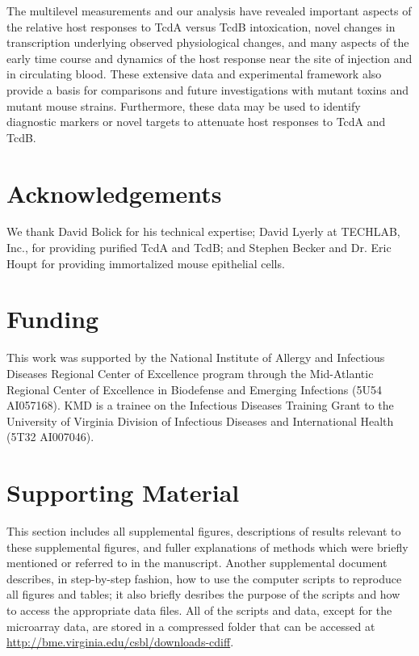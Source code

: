 The multilevel measurements and our analysis have revealed 
important aspects of the relative host responses to TcdA versus 
TcdB intoxication, novel changes in transcription underlying 
observed physiological changes, and many aspects of the early 
time course and dynamics of the host response near the site of 
injection and in circulating blood. These extensive data and 
experimental framework also provide a basis for comparisons and 
future investigations with mutant toxins and mutant mouse strains. 
Furthermore, these data may be used to identify diagnostic markers 
or novel targets to attenuate host responses to TcdA and TcdB. 

\section{Acknowledgements}
We thank David Bolick for his technical expertise; David Lyerly 
at TECHLAB, Inc., for providing purified TcdA and TcdB; and Stephen 
Becker and Dr. Eric Houpt for providing immortalized mouse epithelial cells.

\section{Funding}
This work was supported by the National Institute of Allergy and 
Infectious Diseases Regional Center of Excellence program through 
the Mid-Atlantic Regional Center of Excellence in Biodefense and 
Emerging Infections (5U54 AI057168). KMD is a trainee on the Infectious 
Diseases Training Grant to the University of Virginia Division of 
Infectious Diseases and International Health (5T32 AI007046).

\beginsupplement
\section{Supporting Material}

This section includes all supplemental figures, descriptions of results relevant
to these supplemental figures, and fuller explanations of
methods which were briefly mentioned or referred to in
the manuscript. Another supplemental document describes,
in step-by-step fashion, how to use the computer scripts to
reproduce all figures and tables; it also
briefly desribes the purpose of the scripts and how to access the appropriate
data files. All of the scripts and data, except for the microarray data, are stored 
in a compressed folder that can be accessed at
\url{http://bme.virginia.edu/csbl/downloads-cdiff}.

